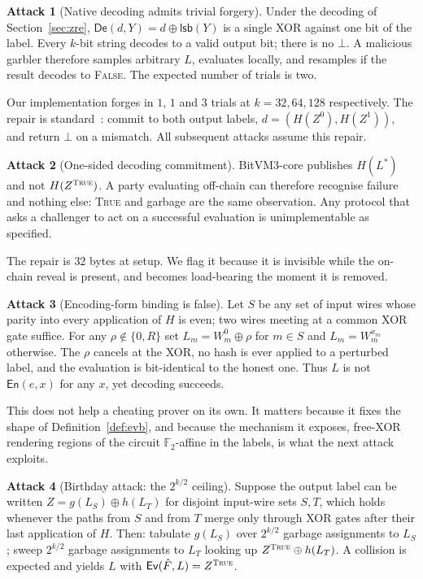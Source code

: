 \documentclass[11pt,a4paper]{article}
\theoremstyle{definition}
\newtheorem{attack}{Attack}
\theoremstyle{plain}
\newcommand{\En}{\mathsf{En}}
\newcommand{\Ev}{\mathsf{Ev}}
\newcommand{\De}{\mathsf{De}}
\newcommand{\lsbf}{\mathsf{lsb}}
\newcommand{\Hh}{H}
\begin{document}
\begin{attack}[Native decoding admits trivial forgery]
\label{atk:lsb}
Under the decoding of Section~\ref{sec:zre}, $\De(d, Y) = d \oplus \lsbf(Y)$ is
a single XOR against one bit of the label. Every $k$-bit string decodes to a
valid output bit; there is no $\bot$. A malicious garbler therefore samples
arbitrary $L$, evaluates locally, and resamples if the result decodes to
\textsc{False}. The expected number of trials is two.
\end{attack}

Our implementation forges in $1$, $1$ and $3$ trials at $k = 32, 64, 128$
respectively. The repair is standard~\cite{ZRE15}: commit to both output labels,
$d = (\Hh(Z^{0}), \Hh(Z^{1}))$, and return $\bot$ on a mismatch. All subsequent
attacks assume this repair.

\begin{attack}[One-sided decoding commitment]
\label{atk:onesided}
BitVM3-core publishes $\Hh(L^{*})$ and not $\Hh(Z^{\textsc{True}})$. A party
evaluating off-chain can therefore recognise failure and nothing else:
\textsc{True} and garbage are the same observation. Any protocol that asks a
challenger to act on a successful evaluation is unimplementable as specified.
\end{attack}

The repair is $32$ bytes at setup. We flag it because it is invisible while the
on-chain reveal is present, and becomes load-bearing the moment it is removed.

\begin{attack}[Encoding-form binding is false]
\label{atk:cancel}
Let $S$ be any set of input wires whose parity into every application of $\Hh$
is even; two wires meeting at a common XOR gate suffice. For any
$\rho \notin \{0, R\}$ set $L_m = W_m^{0} \oplus \rho$ for $m \in S$ and
$L_m = W_m^{x_m}$ otherwise. The $\rho$ cancels at the XOR, no hash is ever
applied to a perturbed label, and the evaluation is bit-identical to the honest
one. Thus $L$ is not $\En(e,x)$ for any $x$, yet decoding succeeds.
\end{attack}

This does not help a cheating prover on its own. It matters because it fixes the
shape of Definition~\ref{def:evb}, and because the mechanism it exposes, free-XOR
rendering regions of the circuit $\mathbb{F}_2$-affine in the labels, is what the
next attack exploits.

\begin{attack}[Birthday attack: the $2^{k/2}$ ceiling]
\label{atk:birthday}
Suppose the output label can be written $Z = g(L_S) \oplus h(L_T)$ for disjoint
input-wire sets $S, T$, which holds whenever the paths from $S$ and from $T$
merge only through XOR gates after their last application of $\Hh$. Then:
tabulate $g(L_S)$ over $2^{k/2}$ garbage assignments to $L_S$; sweep $2^{k/2}$
garbage assignments to $L_T$ looking up $Z^{\textsc{True}} \oplus h(L_T)$. A
collision is expected and yields $L$ with $\Ev(\hat F, L) = Z^{\textsc{True}}$.
\end{attack}
\end{document}

